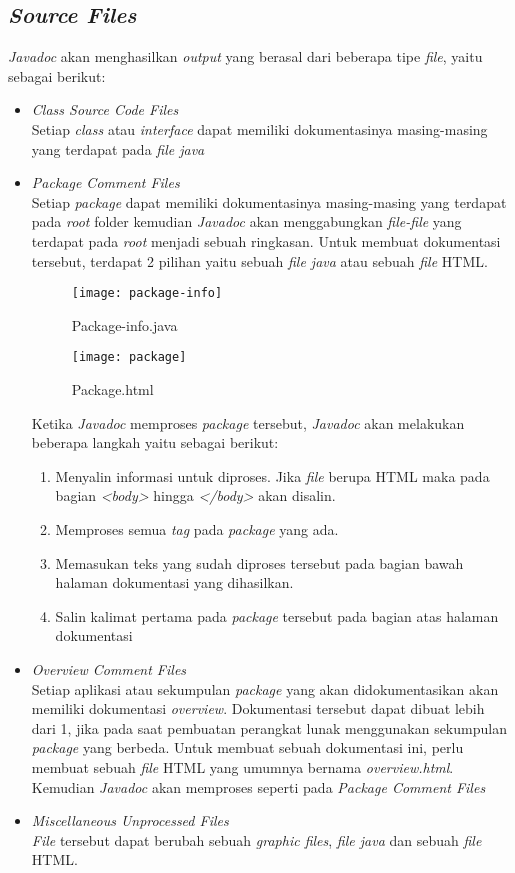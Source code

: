 \subsection{\textit{Source Files}}
\label{sec:source-files}
{\it Javadoc} akan menghasilkan {\it output} yang berasal dari beberapa tipe {\it file}, yaitu sebagai berikut:
\begin{itemize}
	\item {\it Class Source Code Files}\\
	Setiap {\it class} atau {\it interface} dapat memiliki dokumentasinya masing-masing yang terdapat pada {\it file java}
	\item {\it Package Comment Files}\\
	Setiap {\it package} dapat memiliki dokumentasinya masing-masing yang terdapat pada {\it root} folder kemudian {\it Javadoc} akan menggabungkan {\it file-file} yang terdapat pada {\it root} menjadi sebuah ringkasan. Untuk membuat dokumentasi tersebut, terdapat 2 pilihan yaitu sebuah {\it file java} atau sebuah {\it file} HTML.
	\begin{figure}[H]
		\centering  
		\texttt{[image: package-info]}  
		\caption[Package-info]{Package-info.java} 
		\label{fig:package-info} 
	\end{figure}
	\begin{figure}[H]
		\centering  
		\texttt{[image: package]}  
		\caption[Package]{Package.html} 
		\label{fig:package} 
	\end{figure}
	Ketika {\it Javadoc} memproses {\it package} tersebut, {\it Javadoc} akan melakukan beberapa langkah yaitu sebagai berikut:
	\begin{enumerate}
		\item Menyalin informasi untuk diproses. Jika {\it file} berupa HTML maka pada bagian {\it <body>} hingga {\it </body>} akan disalin.
		\item Memproses semua {\it tag} pada {\it package} yang ada.
		\item Memasukan teks yang sudah diproses tersebut pada bagian bawah halaman dokumentasi yang dihasilkan.
		\item Salin kalimat pertama pada {\it package} tersebut pada bagian atas halaman dokumentasi
	\end{enumerate}
	\item {\it Overview Comment Files}\\
	Setiap aplikasi atau sekumpulan {\it package} yang akan didokumentasikan akan memiliki dokumentasi {\it overview}. Dokumentasi tersebut dapat dibuat lebih dari 1, jika pada saat pembuatan perangkat lunak menggunakan sekumpulan {\it package} yang berbeda. Untuk membuat sebuah dokumentasi ini, perlu membuat sebuah {\it file} HTML yang umumnya bernama {\it overview.html}. Kemudian {\it Javadoc} akan memproses seperti pada {\it Package Comment Files}
	\item {\it Miscellaneous Unprocessed Files}\\
	{\it File} tersebut dapat berubah sebuah {\it graphic files}, {\it file java} dan sebuah {\it file} HTML.
\end{itemize}

